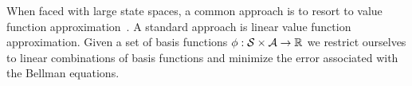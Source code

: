 When faced with large state spaces, a common approach is to resort to value function approximation~\cite{schweitzer1985generalized}. 
A standard approach is linear value function approximation. 
Given a set of basis functions $\phi: \mathcal{S}{}\times \mathcal{A}{} \rightarrow \mathbb{R}$ we restrict ourselves to linear combinations of basis functions
and minimize the error associated with the Bellman equations. 

